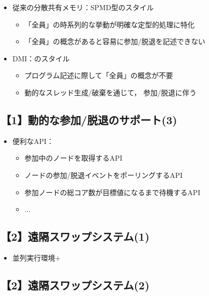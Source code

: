 \documentclass[25pt,landscape,papersize]{jsarticle}
\begin{document}
\begin{itemize}
\item 従来の分散共有メモリ：SPMD型のスタイル
  \begin{itemize}
  \item 「全員」の時系列的な挙動が明確な定型的処理に特化
  \item 「全員」の概念があると容易に参加/脱退を記述できない
  \end{itemize}
\item DMI：のスタイル
  \begin{itemize}
  \item プログラム記述に際して「全員」の概念が不要
  \item 動的なスレッド生成/破棄を通じて，
    参加/脱退に伴う
  \end{itemize}
\end{itemize}

\subsection{【1】動的な参加/脱退のサポート(3)}

\begin{itemize}
\item 便利なAPI：
  \begin{itemize}
  \item 参加中のノードを取得するAPI
  \item ノードの参加/脱退イベントをポーリングするAPI
  \item 参加ノードの総コア数が目標値になるまで待機するAPI
  \item ...
  \end{itemize}
\end{itemize}

\subsection{【2】遠隔スワップシステム(1)}

\begin{itemize}
\item 並列実行環境$+$
\end{itemize}


\subsection{【2】遠隔スワップシステム(2)}
\end{document}
